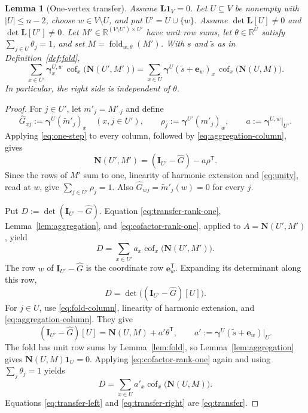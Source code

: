 \documentclass[11pt]{article}
\newtheorem{lemma}[definition]{Lemma}
\newcommand{\R}{\mathbb R}
\newcommand{\one}{\mathbf 1}
\newcommand{\Id}{\mathbf I}
\newcommand{\Lmat}{\mathbf L}
\newcommand{\Nmat}{\mathbf N}
\newcommand{\gam}{\boldsymbol\gamma}
\newcommand{\cof}{\operatorname{cof}}
\begin{document}
\begin{lemma}[One-vertex transfer]\label{lem:transfer}
Assume $\Lmat\one_V=0$. Let $U\subseteq V$ be nonempty with
$|U|\leq n-2$, choose $w\in V\setminus U$, and put
$U'=U\cup\{w\}$. Assume
$\det\Lmat[U]\neq0$ and $\det\Lmat[U']\neq0$.
Let $M'\in\R^{(V\setminus U')\times U'}$ have unit row sums,
let $\theta\in\R^U$ satisfy $\sum_{j\in U}\theta_j=1$,
and set $M=\operatorname{fold}_{w,\theta}(M')$.
With $s$ and $\widetilde s$ as in Definition~\ref{def:fold},
\begin{equation}\label{eq:transfer}
\sum_{x\in U'}\gam^{U,w}_x\,
  \cof_x\bigl(\Nmat(U',M')\bigr)
=\sum_{x\in U}\gam^U(\widetilde s+\mathbf e_w)_x\,
  \cof_x\bigl(\Nmat(U,M)\bigr).
\end{equation}
In particular, the right side is independent of $\theta$.
\end{lemma}
\begin{proof}
For $j\in U'$, let $m'_j=M'_{\cdot j}$ and define
\[
\widehat G_{xj}:=\gam^U(\widetilde m'_j)_x
\quad(x,j\in U'),\qquad
\rho_j:=\gam^{U'}(m'_j)_w,
\qquad a:=\gam^{U,w}|_{U'}.
\]
Applying \eqref{eq:one-step} to every column, followed by
\eqref{eq:aggregation-column}, gives
\begin{equation}\label{eq:transfer-rank-one}
\Nmat(U',M')=(\Id_{U'}-\widehat G)-a\rho^{\mathsf T}.
\end{equation}
Since the rows of $M'$ sum to one, linearity of harmonic extension
and \eqref{eq:unity}, read at $w$, give
$\sum_{j\in U'}\rho_j=1$. Also
$\widehat G_{wj}=\widetilde m'_j(w)=0$ for every $j$.

Put $D:=\det(\Id_{U'}-\widehat G)$. Equation
\eqref{eq:transfer-rank-one}, Lemma~\ref{lem:aggregation}, and
\eqref{eq:cofactor-rank-one}, applied to
$A=\Nmat(U',M')$, yield
\begin{equation}\label{eq:transfer-left}
D=\sum_{x\in U'}a_x\cof_x\bigl(\Nmat(U',M')\bigr).
\end{equation}
The row $w$ of $\Id_{U'}-\widehat G$ is the coordinate row
$\mathbf e_w^{\mathsf T}$. Expanding its determinant along this row,
\begin{equation}\label{eq:transfer-drop}
D=\det\bigl((\Id_{U'}-\widehat G)[U]\bigr).
\end{equation}
For $j\in U$, use \eqref{eq:fold-column}, linearity of harmonic
extension, and \eqref{eq:aggregation-column}. They give
\begin{equation}\label{eq:transfer-block}
(\Id_{U'}-\widehat G)[U]
=\Nmat(U,M)+a'\theta^{\mathsf T},
\qquad
a':=\gam^U(\widetilde s+\mathbf e_w)|_U.
\end{equation}
The fold has unit row sums by Lemma~\ref{lem:fold}, so
Lemma~\ref{lem:aggregation} gives $\Nmat(U,M)\one_U=0$.
Applying \eqref{eq:cofactor-rank-one} again and using
$\sum_j\theta_j=1$ yields
\begin{equation}\label{eq:transfer-right}
D=\sum_{x\in U}a'_x\cof_x\bigl(\Nmat(U,M)\bigr).
\end{equation}
Equations \eqref{eq:transfer-left} and \eqref{eq:transfer-right}
are \eqref{eq:transfer}.
\end{proof}
\end{document}
